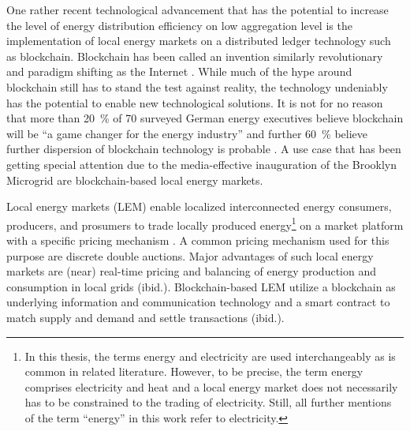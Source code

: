 One rather recent technological advancement that has the potential to increase the level of energy distribution efficiency on low aggregation level is the implementation of local energy markets on a distributed ledger technology such as blockchain. Blockchain has been called an invention similarly revolutionary and paradigm shifting as the Internet \citep{Swan:2015}. While much of the hype around blockchain still has to stand the test against reality, the technology undeniably has the potential to enable new technological solutions. It is not for no reason that more than 20~\% of 70 surveyed German energy executives believe blockchain will be “a game changer for the energy industry” and further 60~\% believe further dispersion of blockchain technology is probable \citep{Burger:2016}. A use case that has been getting special attention due to the media-effective inauguration of the Brooklyn Microgrid \citep{newscientist:2016} are blockchain-based local energy markets.

Local energy markets (LEM) enable localized interconnected energy consumers, producers, and prosumers to trade locally produced energy\footnote{In this thesis, the terms energy and electricity are used interchangeably as is common in related literature. However, to be precise, the term energy comprises electricity and heat and a local energy market does not necessarily has to be constrained to the trading of electricity. Still, all further mentions of the term ``energy'' in this work refer to electricity.} on a market platform with a specific pricing mechanism \citep{Mengelkamp:2018a}. A common pricing mechanism used for this purpose are discrete double auctions\citep{Lamparter:2010, Buchmann:2013, Block:2008}. Major advantages of such local energy markets are (near) real-time pricing and balancing of energy production and consumption in local grids (ibid.). Blockchain-based LEM utilize a blockchain as underlying information and communication technology and a smart contract to match supply and demand and settle transactions (ibid.).


